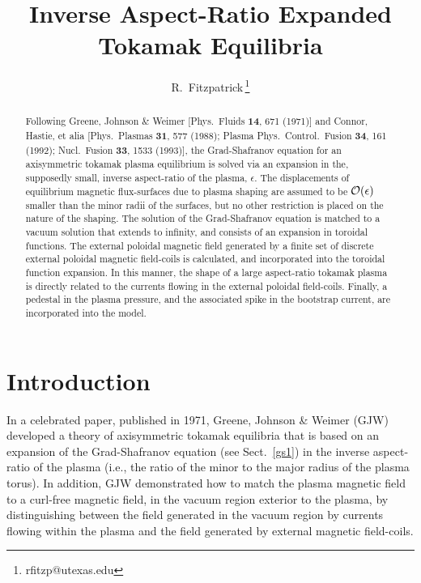 \documentclass[12pt,prb,aps]{revtex4-1}
\begin{document}
\title{Inverse Aspect-Ratio Expanded Tokamak Equilibria}
\author{R.~Fitzpatrick\,\footnote{rfitzp@utexas.edu}}
\begin{abstract}
Following Greene, Johnson \& Weimer  [Phys.\  Fluids  {\bf 14}, 671 (1971)] and Connor, Hastie, et alia [Phys.\ Plasmas {\bf 31}, 577 (1988); Plasma Phys.\ Control.\ Fusion {\bf 34}, 161 (1992); Nucl.\ Fusion {\bf 33}, 1533 (1993)],  the
Grad-Shafranov equation for an axisymmetric tokamak plasma equilibrium  is solved via an expansion in the, supposedly small,  inverse aspect-ratio of the plasma, $\epsilon$. 
The displacements of equilibrium magnetic flux-surfaces due to plasma shaping are assumed to be ${\cal O}(\epsilon)$ smaller than the minor radii
of the surfaces, but no other restriction is placed on the nature of the shaping. The solution of the Grad-Shafranov
equation is matched  to a vacuum solution that extends to infinity, and consists of an expansion in toroidal functions. The external poloidal magnetic
field generated by a finite set of discrete external poloidal magnetic field-coils is calculated, and incorporated  into the toroidal function expansion. 
In this manner, the shape of a large aspect-ratio tokamak plasma is directly related to the currents flowing in the external poloidal field-coils. 
Finally, a pedestal in the plasma pressure, and the associated spike in the bootstrap
current, are incorporated into the model.  
\end{abstract}
\maketitle

\section{Introduction}
In a celebrated paper, published in 1971, Greene, Johnson \& Weimer (GJW) developed a theory of axisymmetric tokamak
equilibria that is based on an expansion of the Grad-Shafranov equation (see Sect.~\ref{gs1}) in the inverse aspect-ratio of the plasma (i.e., the ratio of the minor to the  major radius of the plasma torus).\cite{greene} In addition, GJW demonstrated how to  match the
plasma magnetic field to a curl-free magnetic field, in the vacuum region exterior to the plasma,  by distinguishing between the field generated in the vacuum region by currents flowing within the plasma 
and the field generated by external magnetic field-coils. 
\end{document}
